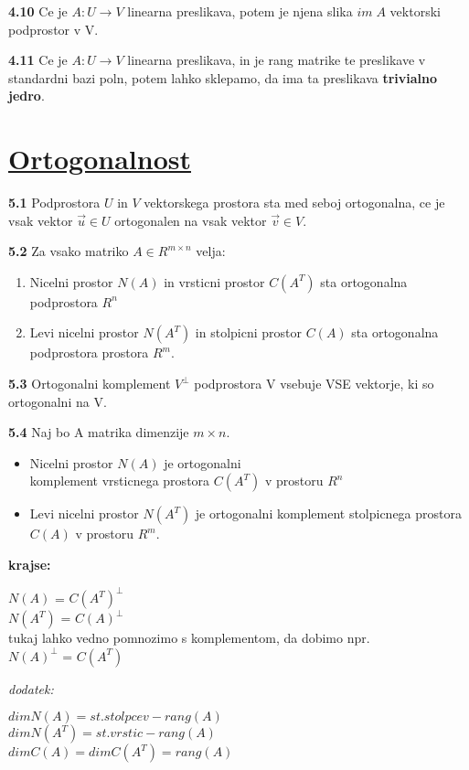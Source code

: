\documentclass{article}
\begin{document}
\begin{multicols}{4}
	\textbf{4.10} Ce je $A: U \rightarrow V$ linearna preslikava, potem je njena slika $im\; A$
	vektorski podprostor v V.

	\textbf{4.11} Ce je $A: U \rightarrow V$ linearna preslikava, in je rang matrike te preslikave v standardni bazi poln,
	potem lahko sklepamo, da ima  ta preslikava \textbf{trivialno jedro}.


	\section{\underline{Ortogonalnost}}

	\textbf{5.1} Podprostora $U$ in $V$ vektorskega prostora sta med seboj ortogonalna,
	ce je vsak vektor $\vec{u} \in U$ ortogonalen na vsak vektor $\vec{v} \in V$.

	\textbf{5.2} Za vsako matriko $A \in R^{m \times n}$ velja:
	\begin{enumerate}
		\item Nicelni prostor $N(A)$ in vrsticni prostor $C(A^{T})$ sta ortogonalna podprostora $R^{n}$
		\item Levi nicelni prostor $N(A^{T})$ in stolpicni prostor $C(A)$ sta ortogonalna podprostora prostora $R^{m}$.
	\end{enumerate}

	\textbf{5.3} Ortogonalni komplement $V^{\perp}$ podprostora V vsebuje VSE vektorje, ki so ortogonalni na V.

	\textbf{5.4} Naj bo A matrika dimenzije $m \times n$.
	\begin{itemize}
		\item Nicelni prostor $N(A)$ je ortogonalni\\ komplement vrsticnega prostora $C(A^{T})$ v prostoru $R^{n}$
		\item Levi nicelni prostor $N(A^{T})$ je ortogonalni komplement stolpicnega prostora $C(A)$ v prostoru $R^{m}$.
	\end{itemize}
	\textbf{krajse:}
	\begin{center}
		$N(A)$ = $C(A^{T})^{\perp}$\\
		$N(A^{T})$ = $C(A)^{\perp}$ \\
		tukaj lahko vedno pomnozimo s komplementom, da dobimo npr.\\
		$N(A)^{\perp}$ = $C(A^{T})$
	\end{center}
	\textit{dodatek:}
	\begin{center}
		$dim N(A) = st. stolpcev - rang(A)$\\
		$dim N(A^{T}) = st. vrstic - rang(A)$\\
		$dim C(A) = dim C(A^{T}) = rang(A)$
	\end{center}


\end{multicols}
\end{document}
